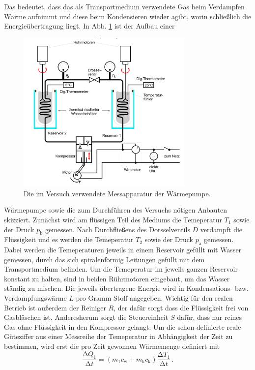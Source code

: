 Das bedeutet, dass das als Transportmedium verwendete Gas beim Verdampfen Wärme 
aufnimmt und diese beim Kondensieren wieder agibt, worin schließlich die 
Energieübertragung liegt. In Abb. \ref{fig:Messapparatur} ist der Aufbau einer
\begin{figure}
    \centering
    \includegraphics[height=8cm]{messdaten/Messapparatur.png}
    \caption{Die im Versuch verwendete Messapparatur der Wärmepumpe.}
    \label{fig:Messapparatur}
\end{figure}
Wärmepumpe sowie die zum Durchführen des Versuchs nötigen Anbauten skizziert.
Zunächst wird am flüssigen Teil des Mediums die Temeperatur $T_1$ sowie der Druck
$p_\text{b}$ gemessen. Nach Durchfließens des Dorsselventils $D$ verdampft die 
Flüssigkeit und es werden die Temeperatur $T_2$ sowie der Druck $p_\text{a}$ 
gemessen. Dabei werden die Temeperaturen jeweils in einem Reservoir gefüllt mit 
Wasser gemessen, durch das sich spiralenförmig Leitungen gefüllt mit dem Transportmedium 
befinden. Um die Temeperatur im jeweils ganzen Reservoir konstant zu halten, sind in beiden 
Rührmotoren eingebaut, um das Wasser ständig zu mischen. Die jeweils übertragene Energie
wird in Kondensations- bzw. Verdampfungswärme $L$ pro Gramm Stoff angegeben.
Wichtig für den realen Betrieb ist außerdem der Reiniger $R$, der dafür sorgt dass die
Flüssigkeit frei von Gasbläschen ist. Anderesherum sorgt die Steuereinheit $S$ dafür,
dass nur reines Gas ohne Flüssigkeit in den Kompressor gelangt.
Um die schon definierte reale Güteziffer aus einer Messreihe der Temeperatur in 
Abhängigkeit der Zeit zu bestimmen, wird erst die pro Zeit gewonnen Wärmemenge definiert mit
\begin{equation}
    \frac{\increment Q_1}{\increment t}=(m_1c_\text{w}+m_\text{k}c_\text{k})\frac{\increment T_1}{\increment t}\,.
\end{equation}
